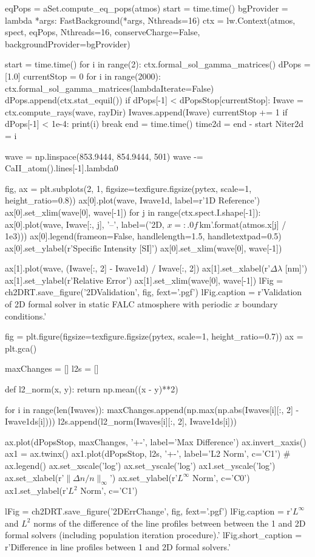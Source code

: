 \begin{pycode}[2DValidation]
eqPops = aSet.compute_eq_pops(atmos)
start = time.time()
bgProvider = lambda *args: FastBackground(*args, Nthreads=16)
ctx = lw.Context(atmos, spect, eqPops, Nthreads=16, conserveCharge=False, backgroundProvider=bgProvider)

start = time.time()
for i in range(2):
    ctx.formal_sol_gamma_matrices()
dPops = [1.0]
currentStop = 0
for i in range(2000):
    ctx.formal_sol_gamma_matrices(lambdaIterate=False)
    dPops.append(ctx.stat_equil())
    if dPops[-1] < dPopsStop[currentStop]:
        Iwave = ctx.compute_rays(wave, rayDir)
        Iwaves.append(Iwave)
        currentStop += 1
    if dPops[-1] < 1e-4:
        print(i)
        break
end = time.time()
time2d = end - start
Niter2d = i

wave = np.linspace(853.9444, 854.9444, 501)
wave -= CaII_atom().lines[-1].lambda0
\end{pycode}

\begin{pycode}[2DValidation]
fig, ax = plt.subplots(2, 1, figsize=texfigure.figsize(pytex, scale=1, height_ratio=0.8))
ax[0].plot(wave, Iwave1d, label=r'1D Reference')
ax[0].set_xlim(wave[0], wave[-1])
for j in range(ctx.spect.I.shape[-1]):
    ax[0].plot(wave, Iwave[:, j], '--', label=('2D, $x={:.0f}$\,\si{{\kilo\metre}}'.format(atmos.x[j] / 1e3)))
ax[0].legend(frameon=False, handlelength=1.5, handletextpad=0.5)
ax[0].set_ylabel(r'Specific Intensity [SI]')
ax[0].set_xlim(wave[0], wave[-1])

ax[1].plot(wave, (Iwave[:, 2] - Iwave1d) / Iwave[:, 2])
ax[1].set_xlabel(r'$\Delta\lambda$ [\si{\nano\metre}]')
ax[1].set_ylabel(r'Relative Error')
ax[1].set_xlim(wave[0], wave[-1])
lFig = ch2DRT.save_figure('2DValidation', fig, fext='.pgf')
lFig.caption = r'Validation of 2D formal solver in static FALC atmosphere with periodic $x$ boundary conditions.'
\end{pycode}

\begin{pycode}[2DValidation]
fig = plt.figure(figsize=texfigure.figsize(pytex, scale=1, height_ratio=0.7))
ax = plt.gca()

maxChanges = []
l2s = []

def l2_norm(x, y):
    return np.mean((x - y)**2)

for i in range(len(Iwaves)):
    maxChanges.append(np.max(np.abs(Iwaves[i][:, 2] - Iwave1ds[i])))
    l2s.append(l2_norm(Iwaves[i][:, 2], Iwave1ds[i]))

ax.plot(dPopsStop, maxChanges, '+-', label='Max Difference')
ax.invert_xaxis()
ax1 = ax.twinx()
ax1.plot(dPopsStop, l2s, '+-', label='L2 Norm', c='C1')
# ax.legend()
ax.set_xscale('log')
ax.set_yscale('log')
ax1.set_yscale('log')
ax.set_xlabel(r'$\|\Delta n / n\|_\infty$')
ax.set_ylabel(r'$L^\infty$ Norm', c='C0')
ax1.set_ylabel(r'$L^2$ Norm', c='C1')

lFig = ch2DRT.save_figure('2DErrChange', fig, fext='.pgf')
lFig.caption = r'$L^\infty$ and $L^2$ norms of the difference of the \CaLine{} line profiles between between the 1 and 2D formal solvers (including population iteration procedure).'
lFig.short_caption = r'Difference in \CaLine{} line profiles between 1 and 2D formal solvers.'
\end{pycode}

